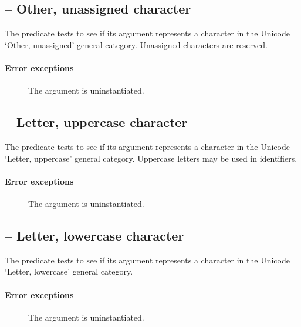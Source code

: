 \subsection{ -- Other, unassigned character}
\label{chars:isCnChar}

The  predicate tests to see if its  argument represents a character in the Unicode `Other, unassigned' general category. Unassigned characters are reserved.
        
\paragraph{Error exceptions}
\begin{description}
\item[]
The argument is uninstantiated.
\end{description}

\subsection{ -- Letter, uppercase character}
\label{chars:isLuChar}

The  predicate tests to see if its  argument represents a character in the Unicode `Letter, uppercase' general category. Uppercase letters may be used in identifiers.
        
\paragraph{Error exceptions}
\begin{description}
\item[]
The argument is uninstantiated.
\end{description}

\subsection{ -- Letter, lowercase character}
\label{chars:isLlChar}

The  predicate tests to see if its  argument represents a character in the Unicode `Letter, lowercase' general category. 
        
\paragraph{Error exceptions}
\begin{description}
\item[]
The argument is uninstantiated.
\end{description}


